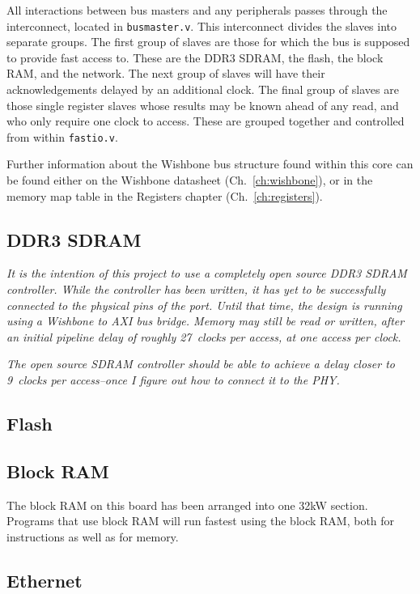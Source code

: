 \documentclass{gqtekspec}
\begin{document}
All interactions between bus masters and any peripherals passes through the
interconnect, located in {\tt busmaster.v}.  This interconnect divides the
slaves into separate groups.  The first group of slaves are those for which the
bus is supposed to provide fast access to.  These are the DDR3 SDRAM, the
flash, the block RAM, and the network.  The next group of slaves will have their
acknowledgements delayed by an additional clock.  The final group of slaves
are those single register slaves whose results may be known ahead of any read,
and who only require one clock to access.  These are grouped together and
controlled from within {\tt fastio.v}.

Further information about the Wishbone bus structure found within this core
can be found either on the Wishbone datasheet (Ch.~\ref{ch:wishbone}), or in
the memory map table in the Registers chapter (Ch.~\ref{ch:registers}).

\subsection{DDR3 SDRAM}

{\em It is the intention of this project to use a completely open source
DDR3 SDRAM controller.  While the controller has been written, it has yet to
be successfully connected to the physical pins of the port.  Until that time,
the design is running using a Wishbone to AXI bus bridge.  Memory may still
be read or written, after an initial pipeline delay of roughly 27~clocks per
access, at one access per clock.}

{\em The open source SDRAM controller should be able to achieve a delay closer
to 9~clocks per access--once I figure out how to connect it to the PHY.}

\subsection{Flash}
\subsection{Block RAM}

The block RAM on this board has been arranged into one 32kW section.
Programs that use block RAM will run fastest using the block RAM, both for
instructions as well as for memory.  

\subsection{Ethernet}
\end{document}
